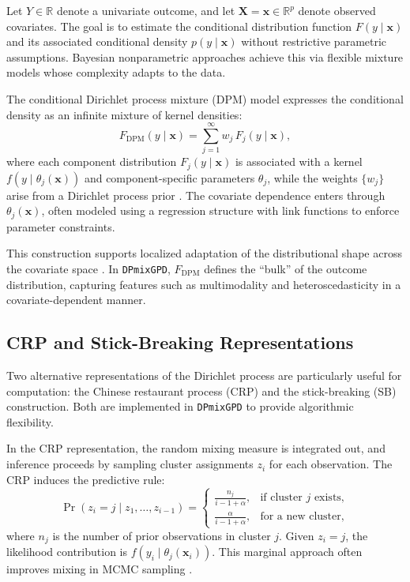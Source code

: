 \documentclass[article]{jss}\usepackage[]{graphicx}\usepackage[]{xcolor}
\begin{document}
Let $Y \in \mathbb{R}$ denote a univariate outcome, and let $\mathbf{X} = \mathbf{x} \in \mathbb{R}^p$ denote observed covariates. The goal is to estimate the conditional distribution function $F(y \mid \mathbf{x})$ and its associated conditional density $p(y \mid \mathbf{x})$ without restrictive parametric assumptions. Bayesian nonparametric approaches achieve this via flexible mixture models whose complexity adapts to the data.

The conditional Dirichlet process mixture (DPM) model expresses the conditional density as an infinite mixture of kernel densities:
\[
F_{\text{DPM}}(y \mid \mathbf{x}) = \sum_{j=1}^\infty w_j \, F_j(y \mid \mathbf{x}),
\]
where each component distribution $F_j(y \mid \mathbf{x})$ is associated with a kernel $f(y \mid \theta_j(\mathbf{x}))$ and component-specific parameters $\theta_j$, while the weights $\{w_j\}$ arise from a Dirichlet process prior \citep{ferguson1973bayesian, lo1984class}. The covariate dependence enters through $\theta_j(\mathbf{x})$, often modeled using a regression structure with link functions to enforce parameter constraints.

This construction supports localized adaptation of the distributional shape across the covariate space \citep{muller1996bayesian, gelfand2005bayesian}. In \texttt{DPmixGPD}, $F_{\text{DPM}}$ defines the ``bulk'' of the outcome distribution, capturing features such as multimodality and heteroscedasticity in a covariate-dependent manner.

\subsection{CRP and Stick-Breaking Representations}

Two alternative representations of the Dirichlet process are particularly useful for computation: the Chinese restaurant process (CRP) and the stick-breaking (SB) construction. Both are implemented in \texttt{DPmixGPD} to provide algorithmic flexibility.

In the CRP representation, the random mixing measure is integrated out, and inference proceeds by sampling cluster assignments $z_i$ for each observation. The CRP induces the predictive rule:
\[
\Pr(z_i = j \mid z_1,\ldots,z_{i-1}) =
\begin{cases}
\frac{n_j}{i - 1 + \alpha}, & \text{if cluster } j \text{ exists}, \\
\frac{\alpha}{i - 1 + \alpha}, & \text{for a new cluster},
\end{cases}
\]
where $n_j$ is the number of prior observations in cluster $j$. Given $z_i = j$, the likelihood contribution is $f(y_i \mid \theta_j(\mathbf{x}_i))$. This marginal approach often improves mixing in MCMC sampling \citep{neal2000markov}.
\end{document}
